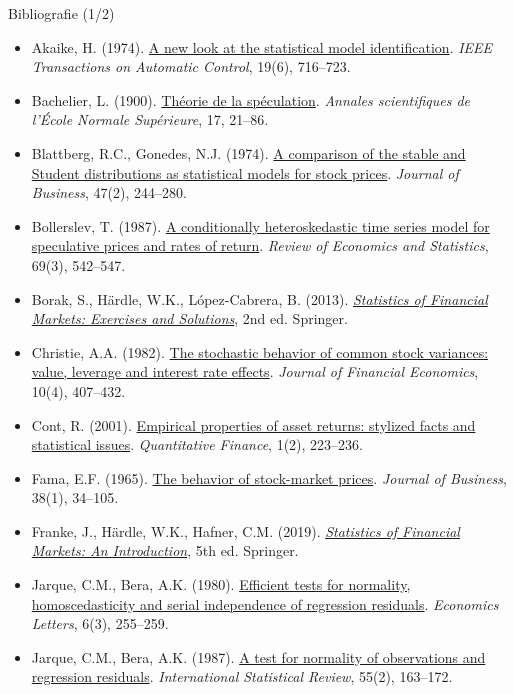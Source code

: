 \begin{frame}{Bibliografie (1/2)}
\itemsize{\tiny}
\begin{itemize}
    \item Akaike, H. (1974). \href{https://doi.org/10.1109/TAC.1974.1100705}{A new look at the statistical model identification}. \textit{IEEE Transactions on Automatic Control}, 19(6), 716--723.
    \item Bachelier, L. (1900). \href{https://doi.org/10.24033/asens.476}{Théorie de la spéculation}. \textit{Annales scientifiques de l'École Normale Supérieure}, 17, 21--86.
    \item Blattberg, R.C., Gonedes, N.J. (1974). \href{https://doi.org/10.1086/295634}{A comparison of the stable and Student distributions as statistical models for stock prices}. \textit{Journal of Business}, 47(2), 244--280.
    \item Bollerslev, T. (1987). \href{https://doi.org/10.2307/1925546}{A conditionally heteroskedastic time series model for speculative prices and rates of return}. \textit{Review of Economics and Statistics}, 69(3), 542--547.
    \item Borak, S., Härdle, W.K., López-Cabrera, B. (2013). \href{https://doi.org/10.1007/978-3-642-33929-5}{\textit{Statistics of Financial Markets: Exercises and Solutions}}, 2nd ed. Springer.
    \item Christie, A.A. (1982). \href{https://doi.org/10.1016/0304-405X(82)90018-6}{The stochastic behavior of common stock variances: value, leverage and interest rate effects}. \textit{Journal of Financial Economics}, 10(4), 407--432.
    \item Cont, R. (2001). \href{https://doi.org/10.1080/713665670}{Empirical properties of asset returns: stylized facts and statistical issues}. \textit{Quantitative Finance}, 1(2), 223--236.
    \item Fama, E.F. (1965). \href{https://doi.org/10.1086/294743}{The behavior of stock-market prices}. \textit{Journal of Business}, 38(1), 34--105.
    \item Franke, J., Härdle, W.K., Hafner, C.M. (2019). \href{https://doi.org/10.1007/978-3-030-13751-9}{\textit{Statistics of Financial Markets: An Introduction}}, 5th ed. Springer.
    \item Jarque, C.M., Bera, A.K. (1980). \href{https://doi.org/10.1016/0165-1765(80)90024-5}{Efficient tests for normality, homoscedasticity and serial independence of regression residuals}. \textit{Economics Letters}, 6(3), 255--259.
    \item Jarque, C.M., Bera, A.K. (1987). \href{https://doi.org/10.2307/1403192}{A test for normality of observations and regression residuals}. \textit{International Statistical Review}, 55(2), 163--172.
\end{itemize}
\end{frame}

